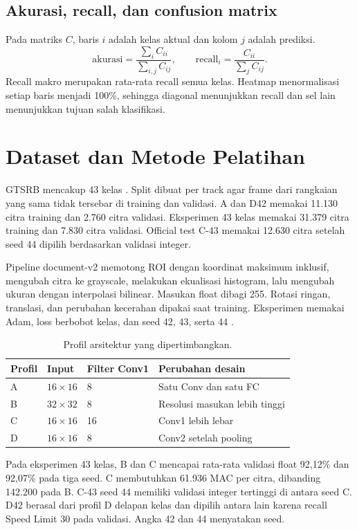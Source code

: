 \documentclass[11pt,a4paper]{article}
\begin{document}
\subsection{Akurasi, recall, dan confusion matrix}
Pada matriks \(C\), baris \(i\) adalah kelas aktual dan kolom \(j\)
adalah prediksi.
\[
 \mathrm{akurasi}=\frac{\sum_i C_{ii}}{\sum_{i,j} C_{ij}},\qquad
 \mathrm{recall}_i=\frac{C_{ii}}{\sum_j C_{ij}}.
\]
Recall makro merupakan rata-rata recall semua kelas. Heatmap
menormalisasi setiap baris menjadi 100\%, sehingga diagonal menunjukkan
recall dan sel lain menunjukkan tujuan salah klasifikasi.

\section{Dataset dan Metode Pelatihan}
GTSRB mencakup 43 kelas \cite{stallkamp}. Split dibuat per track agar
frame dari rangkaian yang sama tidak tersebar di training dan validasi.
A dan D42 memakai 11.130 citra training dan 2.760 citra validasi.
Eksperimen 43 kelas memakai 31.379 citra training dan 7.830 citra
validasi. Official test C-43 memakai 12.630 citra setelah seed 44
dipilih berdasarkan validasi integer.

Pipeline document-v2 memotong ROI dengan koordinat maksimum inklusif,
mengubah citra ke grayscale, melakukan ekualisasi histogram, lalu
mengubah ukuran dengan interpolasi bilinear. Masukan float dibagi 255.
Rotasi ringan, translasi, dan perubahan kecerahan dipakai saat training.
Eksperimen memakai Adam, loss berbobot kelas, dan seed 42, 43, serta 44
\cite{repo}.

\begin{table}[H]
\centering
\caption{Profil arsitektur yang dipertimbangkan.}
\begin{tabular}{llll}
\toprule
Profil & Input & Filter Conv1 & Perubahan desain \\
\midrule
A & $16\times16$ & 8 & Satu Conv dan satu FC \\
B & $32\times32$ & 8 & Resolusi masukan lebih tinggi \\
C & $16\times16$ & 16 & Conv1 lebih lebar \\
D & $16\times16$ & 8 & Conv2 setelah pooling \\
\bottomrule
\end{tabular}
\end{table}

Pada eksperimen 43 kelas, B dan C mencapai rata-rata validasi float
92,12\% dan 92,07\% pada tiga seed. C membutuhkan 61.936 MAC per citra,
dibanding 142.200 pada B. C-43 seed 44 memiliki validasi integer tertinggi
di antara seed C. D42 berasal dari profil D delapan kelas dan dipilih
antara lain karena recall Speed Limit 30 pada validasi. Angka 42 dan
44 menyatakan seed.
\end{document}
